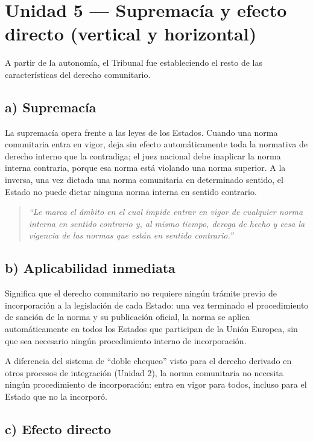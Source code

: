 \documentclass[12pt,oneside]{book}
\begin{document}
\section{Unidad 5 --- Supremacía y efecto directo (vertical y horizontal)}

A partir de la autonomía, el Tribunal fue estableciendo el resto de las características del derecho comunitario.

\subsection*{a) Supremacía}

La supremacía opera frente a las leyes de los Estados. Cuando una norma comunitaria entra en vigor, deja sin efecto automáticamente toda la normativa de derecho interno que la contradiga; el juez nacional debe inaplicar la norma interna contraria, porque esa norma está violando una norma superior. A la inversa, una vez dictada una norma comunitaria en determinado sentido, el Estado no puede dictar ninguna norma interna en sentido contrario.

\begin{quote}
\itshape ``Le marca el ámbito en el cual impide entrar en vigor de cualquier norma interna en sentido contrario y, al mismo tiempo, deroga de hecho y cesa la vigencia de las normas que están en sentido contrario.''
\end{quote}

\subsection*{b) Aplicabilidad inmediata}

Significa que el derecho comunitario no requiere ningún trámite previo de incorporación a la legislación de cada Estado: una vez terminado el procedimiento de sanción de la norma y su publicación oficial, la norma se aplica automáticamente en todos los Estados que participan de la Unión Europea, sin que sea necesario ningún procedimiento interno de incorporación.

\begin{note}
A diferencia del sistema de ``doble chequeo'' visto para el derecho derivado en otros procesos de integración (Unidad 2), la norma comunitaria no necesita ningún procedimiento de incorporación: entra en vigor para todos, incluso para el Estado que no la incorporó.
\end{note}

\subsection*{c) Efecto directo}
\end{document}
